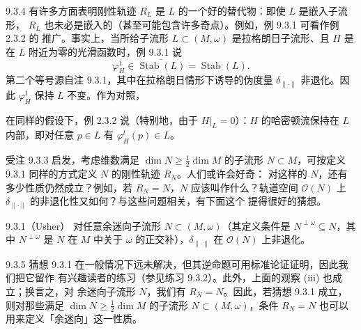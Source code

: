 \begin{wrem}{9.3.4}
  有许多方面表明刚性轨迹 $R_L$ 是 $L$ 的一个好的替代物：即使 $L$ 是嵌入子流形，
  $R_L$ 也未必是嵌入的（甚至可能包含许多奇点）。例如，例 9.3.1 可看作例 2.3.2 的
  推广。事实上，当所给子流形 $L\subset(M,\omega)$ 是拉格朗日子流形、且 $H$ 是在
  $L$ 附近为零的光滑函数时，例 9.3.1 说
  \begin{equation*}
    \varphi_H^1\in\overline{\operatorname{Stab}(L)}=\operatorname{Stab}(L).
  \end{equation*}
  第二个等号源自注 9.3.1，其中在拉格朗日情形下诱导的伪度量
  $\delta_{\|\cdot\|}$ 非退化。因此 $\varphi_H^1$ 保持 $L$ 不变。作为对照，

  在同样的假设下，例 2.3.2 说（特别地，由于 $H|_L=0$）：$H$ 的哈密顿流保持在 $L$
  内部，即对任意 $p\in L$ 有 $\varphi_H^t(p)\in L$。
\end{wrem}

受注 9.3.3 启发，考虑维数满足 $\dim N\geqslant\tfrac12\dim M$ 的子流形
$N\subset M$，可按定义 9.3.1 同样的方式定义 $N$ 的刚性轨迹 $R_N$。人们或许会好奇：
对这样的 $N$，还有多少性质仍然成立？例如，若 $R_N=N$，$N$ 应该叫作什么？轨道空间
$\mathcal O(N)$ 上 $\delta_{\|\cdot\|}$ 的非退化性又如何？与这些问题相关，有下面这个
提得很好的猜想。

\begin{wconj}{9.3.1}（Usher）
  对任意余迷向子流形 $N\subset(M,\omega)$（其定义条件是
  $N^{\perp\omega}\subseteq N$，其中 $N^{\perp\omega}$ 是 $N$ 在 $M$ 中关于
  $\omega$ 的正交补），$\delta_{\|\cdot\|}$ 在 $\mathcal O(N)$ 上非退化。
\end{wconj}

\begin{wrem}{9.3.5}
  猜想 9.3.1 在一般情况下远未解决，但其逆命题可用标准论证证明，因此我们把它留作
  有兴趣读者的练习（参见练习 9.3.2）。此外，上面的观察 (iii) 也成立；换言之，对
  余迷向子流形 $N$，我们有 $R_N=N$。因此，若猜想 9.3.1 成立，则对那些满足
  $\dim N\geqslant\tfrac12\dim M$ 的子流形 $N\subset(M,\omega)$，条件 $R_N=N$
  也可以用来定义「余迷向」这一性质。
\end{wrem}

